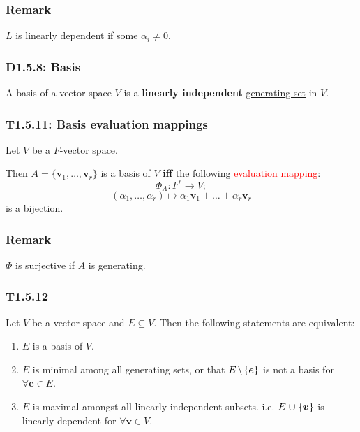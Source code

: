 \documentclass{article}
\newcommand{\vc}[1]{\boldsymbol{#1}}
\begin{document}
\begin{multicols*}{3}
\subsubsection*{Remark}
$L$ is linearly dependent if some $\alpha_i\neq0$.

\subsubsection*{D1.5.8: Basis}
A basis of a vector space $V$ is a \textbf{linearly independent}
\underline{generating set} in $V$.

\subsubsection*{T1.5.11: Basis evaluation mappings}
Let $V$ be a $F$-vector space.

Then $A=\{\vc{v}_1,\dots,\vc{v}_r\}$ is a basis of $V$
\textbf{if{}f} the following \textcolor{red}{evaluation mapping}:
$$\Phi_A:F^r\rightarrow V;$$
$$(\alpha_1,\dots,\alpha_r)\mapsto
\alpha_1\vc{v}_1+\dots+\alpha_r\vc{v}_r$$
is a bijection.

\subsubsection*{Remark}
$\Phi$ is surjective if $A$ is generating.

\subsubsection*{T1.5.12}
Let $V$ be a vector space and $E\subseteq V$.
Then the following statements are equivalent:
\begin{enumerate}
    \item $E$ is a basis of $V$.
    
    \item $E$ is minimal among all generating sets,
    or that $E\hspace{0.02in}\backslash\hspace{0.02in}
    \{\vc{e}\}$ is not a basis for $\forall\vc{e}\in E$.

    \item $E$ is maximal amongst all linearly independent subsets.
    i.e. $E\hspace{0.01in}\cup\hspace{0.01in}\{\vc{v}\}$
    is linearly dependent for $\forall\vc{v}\in V$.
\end{enumerate}


\end{multicols*}
\end{document}
